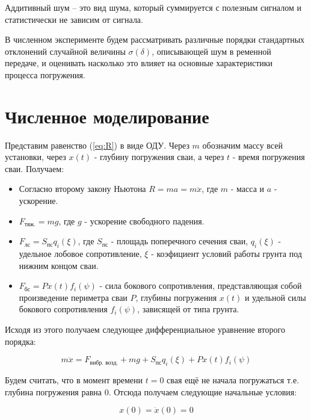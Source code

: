 \begin{definition}
    Аддитивный шум -- это вид шума, который суммируется с полезным сигналом и статистически не зависим
    от сигнала.
\end{definition}

В численном эксперименте будем рассматривать различные порядки стандартных отклонений случайной
величины $\sigma(\delta)$, описывающей шум в ременной передаче, и оценивать насколько это влияет на
основные характеристики процесса погружения.

\clearpage

\section{Численное моделирование}

Представим равенство (\ref{eq:R}) в виде ОДУ. Через $m$ обозначим массу всей установки, через $x(t)$ - глубину
погружения сваи, а через $t$ - время погружения сваи. Получаем:

\begin{itemize}
\item Согласно второму закону Ньютона $R = ma = m\ddot{x}$, где $m$ - масса и $a$ - ускорение.
\item $F_\text{тяж.} = mg$, где $g$ - ускорение свободного падения.
\item $F_\text{лс} = S_\text{пс} q_i(\xi)$, где $S_\text{пс}$ - площадь поперечного сечения сваи,
$q_i(\xi)$ - удельное лобовое сопротивление, $\xi$ - коэфициент условий работы грунта под нижним концом сваи.
\item $F_\text{бс} = P x(t) f_i(\psi)$ - сила бокового сопротивления, представляющая собой произведение периметра сваи
$P$, глубины погружения $x(t)$ и удельной силы бокового сопротивления $f_i(\psi)$, зависящей от типа грунта.
\end{itemize}

\noindent Исходя из этого получаем следующее дифференциальное уравнение второго порядка:

\begin{equation}
    \label{eq:main}
    m\ddot{x} = F_\text{вибр. возд.} + mg + S_\text{пс} q_i(\xi) + P x(t) f_i(\psi)
\end{equation}

\noindent Будем считать, что в момент времени $t = 0$ свая ещё не начала погружаться т.е.
глубина погружения равна 0. Отсюда получаем следующие начальные условия:

\begin{equation}
    x(0) = \dot{x}(0) = 0
\end{equation}

